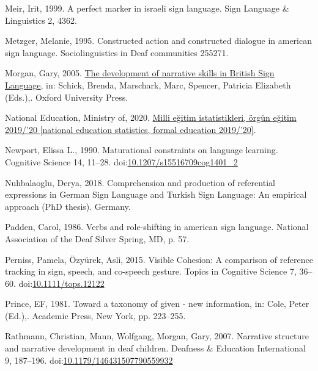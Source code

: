 \documentclass[]{elsarticle} %
\newlength{\cslhangindent}
\newenvironment{CSLReferences}[2] %
 {%
  \setlength{\parindent}{0pt}
  \ifodd #1 \everypar{\setlength{\hangindent}{\cslhangindent}}\ignorespaces\fi
  \ifnum #2 > 0
  \setlength{\parskip}{#2\baselineskip}
  \fi
 }%
 {}
\begin{document}
\begin{CSLReferences}{1}{0}
\leavevmode{}%
Meir, Irit, 1999. A perfect marker in israeli sign language. Sign
Language \& Linguistics 2, 4362.

\leavevmode{}%
Metzger, Melanie, 1995. Constructed action and constructed dialogue in
american sign language. Sociolinguistics in Deaf communities 255271.

\leavevmode{}%
Morgan, Gary, 2005.
\href{http://www.oxfordscholarship.com/view/10.1093/acprof:oso/9780195180947.001.0001/acprof-9780195180947}{The
development of narrative skills in British Sign Language}, in: Schick,
Brenda, Marschark, Marc, Spencer, Patricia Elizabeth (Eds.),. Oxford
University Press.

\leavevmode{}%
National Education, Ministry of, 2020.
\href{http://sgb.meb.gov.tr/meb_iys_dosyalar/2020_09/04144812_meb_istatistikleri_orgun_\%20egitim_2019_2020.pdf}{Milli
e{ğ}itim istatistikleri, örgün e{ğ}itim 2019/{'}20 {[}national education
statistics, formal education 2019/{'}20{]}}.

\leavevmode{}%
Newport, Elissa L., 1990. Maturational constraints on language learning.
Cognitive Science 14, 11--28.
doi:\href{https://doi.org/10.1207/s15516709cog1401_2}{10.1207/s15516709cog1401\_2}

\leavevmode{}%
Nuhbalaoglu, Derya, 2018. Comprehension and production of referential
expressions in German Sign Language and Turkish Sign Language: An
empirical approach (PhD thesis). Germany.

\leavevmode{}%
Padden, Carol, 1986. Verbs and role-shifting in american sign language.
National Association of the Deaf Silver Spring, MD, p. 57.

\leavevmode{}%
Perniss, Pamela, Özyürek, Asli, 2015. Visible Cohesion: A comparison of
reference tracking in sign, speech, and co-speech gesture. Topics in
Cognitive Science 7, 36--60.
doi:\href{https://doi.org/10.1111/tops.12122}{10.1111/tops.12122}

\leavevmode{}%
Prince, EF, 1981. Toward a taxonomy of given - new information, in:
Cole, Peter (Ed.),. Academic Press, New York, pp. 223--255.

\leavevmode{}%
Rathmann, Christian, Mann, Wolfgang, Morgan, Gary, 2007. Narrative
structure and narrative development in deaf children. Deafness \&
Education International 9, 187--196.
doi:\href{https://doi.org/10.1179/146431507790559932}{10.1179/146431507790559932}


\end{CSLReferences}
\end{document}
